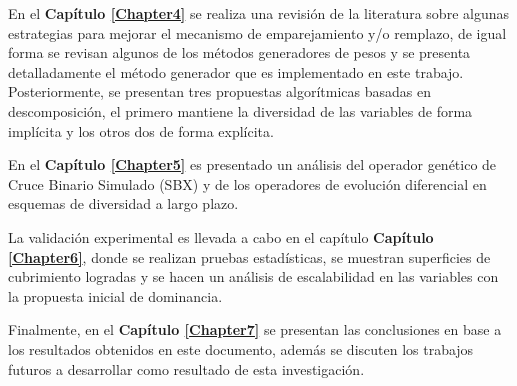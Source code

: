 En el \textbf{Capítulo \ref{Chapter4}} se realiza una revisión de la literatura sobre algunas estrategias para mejorar el mecanismo de emparejamiento y/o remplazo, de igual forma se revisan algunos de los métodos generadores de pesos y se presenta detalladamente el método generador que es implementado en este trabajo.
%
Posteriormente, se presentan tres propuestas algorítmicas basadas en descomposición, el primero mantiene la diversidad de las variables de forma implícita y los otros dos de forma explícita.
%

En el \textbf{Capítulo \ref{Chapter5}} es presentado un análisis del operador genético de Cruce Binario Simulado (SBX) y de los operadores de evolución diferencial en esquemas de diversidad a largo plazo.

La validación experimental es llevada a cabo en el capítulo \textbf{Capítulo \ref{Chapter6}}, donde se realizan pruebas estadísticas, se muestran superficies de cubrimiento logradas y se hacen un análisis de escalabilidad en las variables con la propuesta inicial de dominancia.


%
Finalmente, en el \textbf{Capítulo \ref{Chapter7}} se presentan las conclusiones en base a los resultados obtenidos en este documento, además se discuten los trabajos futuros a desarrollar como resultado de esta investigación.
